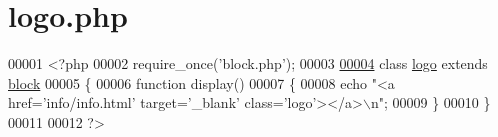 \hypertarget{logo_8php_source}{\section{logo.\-php}
}

\begin{DoxyCode}
00001 <?php
00002 require\_once(\textcolor{stringliteral}{'block.php'});
00003 
\hypertarget{logo_8php_source_l00004}{}\hyperlink{classlogo}{00004} \textcolor{keyword}{class }\hyperlink{classlogo}{logo} \textcolor{keyword}{extends} \hyperlink{classblock}{block}
00005 \{  
00006   \textcolor{keyword}{function} display()
00007   \{
00008     echo \textcolor{stringliteral}{"<a href='info/info.html' target='\_blank' class='logo'></a>\(\backslash\)n"};
00009   \}
00010 \}
00011 
00012 ?>
\end{DoxyCode}
